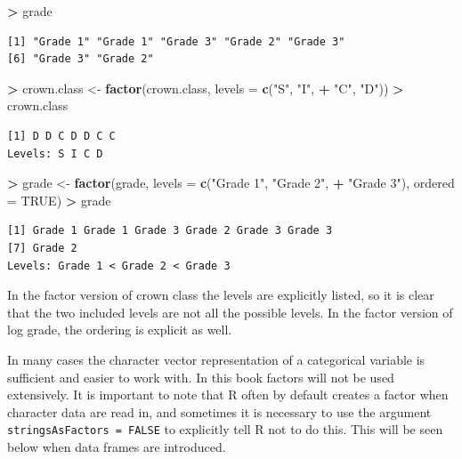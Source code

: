 \documentclass[]{krantz}
\makeatletter
\newenvironment{Shaded}{\begin{snugshade}}{\end{snugshade}}
\newcommand{\DataTypeTok}[1]{\textcolor[rgb]{0.27,0.27,0.27}{#1}}
\newcommand{\KeywordTok}[1]{\textcolor[rgb]{0.27,0.27,0.27}{\textbf{#1}}}
\newcommand{\NormalTok}[1]{#1}
\newcommand{\OperatorTok}[1]{\textcolor[rgb]{0.43,0.43,0.43}{\textbf{#1}}}
\newcommand{\OtherTok}[1]{\textcolor[rgb]{0.37,0.37,0.37}{#1}}
\newcommand{\StringTok}[1]{\textcolor[rgb]{0.5,0.5,0.5}{#1}}
\newenvironment{kframe}{%
\medskip{}
\setlength{\fboxsep}{.8em}
 \def\at@end@of@kframe{}%
 \ifinner\ifhmode%
  \def\at@end@of@kframe{\end{minipage}}%
  \begin{minipage}{\columnwidth}%
 \fi\fi%
 \def\FrameCommand##1{\hskip\@totalleftmargin \hskip-\fboxsep
 \colorbox{shadecolor}{##1}\hskip-\fboxsep
     \hskip-\linewidth \hskip-\@totalleftmargin \hskip\columnwidth}%
 \MakeFramed {\advance\hsize-\width
   \@totalleftmargin\z@ \linewidth\hsize
   \@setminipage}}%
 {\par\unskip\endMakeFramed%
 \at@end@of@kframe}
\renewenvironment{Shaded}{\begin{kframe}}{\end{kframe}}
\makeatother
\begin{document}
\begin{Shaded}
\begin{Highlighting}[]
\OperatorTok{>}\StringTok{ }\NormalTok{grade}
\end{Highlighting}
\end{Shaded}

\begin{verbatim}
[1] "Grade 1" "Grade 1" "Grade 3" "Grade 2" "Grade 3"
[6] "Grade 3" "Grade 2"
\end{verbatim}

\begin{Shaded}
\begin{Highlighting}[]
\OperatorTok{>}\StringTok{ }\NormalTok{crown.class <-}\StringTok{ }\KeywordTok{factor}\NormalTok{(crown.class, }\DataTypeTok{levels =} \KeywordTok{c}\NormalTok{(}\StringTok{"S"}\NormalTok{, }\StringTok{"I"}\NormalTok{, }
\OperatorTok{+}\StringTok{   "C"}\NormalTok{, }\StringTok{"D"}\NormalTok{))}
\OperatorTok{>}\StringTok{ }\NormalTok{crown.class}
\end{Highlighting}
\end{Shaded}

\begin{verbatim}
[1] D D C D D C C
Levels: S I C D
\end{verbatim}

\begin{Shaded}
\begin{Highlighting}[]
\OperatorTok{>}\StringTok{ }\NormalTok{grade <-}\StringTok{ }\KeywordTok{factor}\NormalTok{(grade, }\DataTypeTok{levels =} \KeywordTok{c}\NormalTok{(}\StringTok{"Grade 1"}\NormalTok{, }\StringTok{"Grade 2"}\NormalTok{, }
\OperatorTok{+}\StringTok{   "Grade 3"}\NormalTok{), }\DataTypeTok{ordered =} \OtherTok{TRUE}\NormalTok{)}
\OperatorTok{>}\StringTok{ }\NormalTok{grade}
\end{Highlighting}
\end{Shaded}

\begin{verbatim}
[1] Grade 1 Grade 1 Grade 3 Grade 2 Grade 3 Grade 3
[7] Grade 2
Levels: Grade 1 < Grade 2 < Grade 3
\end{verbatim}

In the factor version of crown class the levels are explicitly listed, so it is clear that the two included levels are not all the possible levels. In the factor version of log grade, the ordering is explicit as well.

In many cases the character vector representation of a categorical variable is sufficient and easier to work with. In this book factors will not be used extensively. It is important to note that R often by default creates a factor when character data are read in, and sometimes it is necessary to use the argument \texttt{stringsAsFactors\ =\ FALSE} to explicitly tell R not to do this. This will be seen below when data frames are introduced.
\end{document}
